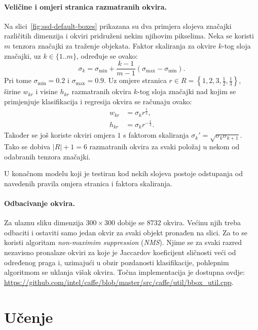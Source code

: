 \documentclass[utf8, diplomski, numeric, lmodern]{fer}
\begin{document}
\paragraph{Veličine i omjeri stranica razmatranih okvira.} \label{par:ssd-model-okviri}
Na slici~\ref{fig:ssd-default-boxes} prikazana su dva primjera slojeva značajki različitih dimenzija i okviri pridruženi nekim njihovim pikselima. Neka se koristi $m$ tenzora značajki za traženje objekata. Faktor skaliranja za okvire $k$-tog sloja značajki, uz $k\in \{1..m\}$, određuje se ovako:
\begin{equation}
\sigma_k = \sigma_\mathrm{min} + \frac{k-1}{m-1}(\sigma_\mathrm{max}-\sigma_\mathrm{min}).
\end{equation}
Pri tome $\sigma_\mathrm{min} = 0.2$ i $\sigma_\mathrm{max}=0.9$. Uz omjere stranica $r\in R=\left\{1,2,3,\frac{1}{2},\frac{1}{3}\right\}$, širine $w_{kr}$ i visine $h_{kr}$ razmatranih okvira $k$-tog sloja značajki nad kojim se primjenjuje klasifikacija i regresija okvira se računaju ovako:
\begin{align}
w_{kr} &= \sigma_k r^{\frac{1}{2}}, \\
h_{kr} &= \sigma_k r^{-\frac{1}{2}}.
\end{align}
Također se još koriste okviri omjera $1$ s faktorom skaliranja $\sigma_k'=\sqrt{\sigma_k \sigma_{k+1}}$. Tako se dobiva $|R|+1=6$ razmatranih okvira za svaki položaj u nekom od odabranih tenzora značajki. 

U konačnom modelu koji je testiran kod nekih slojeva postoje odstupanja od navedenih pravila omjera stranica i faktora skaliranja.

\paragraph{Odbacivanje okvira.}
Za ulaznu sliku dimenzija $300\times 300$ dobije se $8732$ okvira. Većinu njih treba odbaciti i ostaviti samo jedan okvir za svaki objekt pronađen na slici. Za to se koristi algoritam \emph{non-maximim suppression} (\emph{NMS}). Njime se za svaki razred nezavisno pronalaze okviri za koje je Jaccardov koeficijent sličnosti veći od određenog praga i, uzimajući u obzir pozdanosti klasifikacije, pohlepnim algoritmom se uklanja višak okvira. Točna implementacija je dostupna ovdje: \url{https://github.com/intel/caffe/blob/master/src/caffe/util/bbox_util.cpp}.

\section{Učenje} \label{sec:ssd-ucenje}
\end{document}
